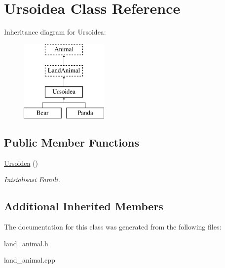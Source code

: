 \hypertarget{class_ursoidea}{}\section{Ursoidea Class Reference}
\label{class_ursoidea}
Inheritance diagram for Ursoidea\+:\begin{figure}[H]
\begin{center}
\leavevmode
\includegraphics[height=4.000000cm]{class_ursoidea}
\end{center}
\end{figure}
\subsection*{Public Member Functions}
\begin{DoxyCompactItemize}
\item 
\hyperlink{class_ursoidea_a29e3319ed126f6b46f014696df2d90a0}{Ursoidea} ()\hypertarget{class_ursoidea_a29e3319ed126f6b46f014696df2d90a0}{}\label{class_ursoidea_a29e3319ed126f6b46f014696df2d90a0}

\begin{DoxyCompactList}\small\item\em Inisialisasi Famili. \end{DoxyCompactList}\end{DoxyCompactItemize}
\subsection*{Additional Inherited Members}


The documentation for this class was generated from the following files\+:\begin{DoxyCompactItemize}
\item 
land\+\_\+animal.\+h\item 
land\+\_\+animal.\+cpp\end{DoxyCompactItemize}
